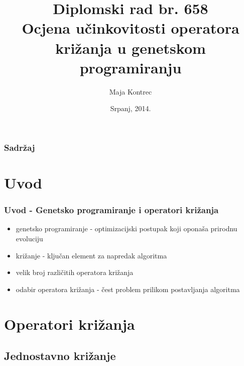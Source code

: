 \documentclass{beamer}
\title{\scriptsize{Diplomski rad br. 658} \\ \large{Ocjena učinkovitosti operatora križanja u genetskom programiranju}}
\author{Maja Kontrec}
\institute[FER]{Fakultet elektrotehnike i računarstva}
\date{Srpanj, 2014.}
\begin{document}
\begin{frame}
\titlepage %
\end{frame}

\begin{frame}
\frametitle{Sadržaj} %
\tableofcontents %
\end{frame}


\section{Uvod}

\begin{frame}

\frametitle{Uvod - Genetsko programiranje i operatori križanja} 
\begin{itemize}
\item{genetsko programiranje - optimizacijski postupak koji oponaša prirodnu evoluciju}
\item{križanje - ključan element za napredak algoritma}
\item{velik broj različitih operatora križanja}
\item{odabir operatora križanja - čest problem prilikom postavljanja algoritma}
\end{itemize}

\end{frame}

\section{Operatori križanja}
\subsection{Jednostavno križanje}
\end{document}
